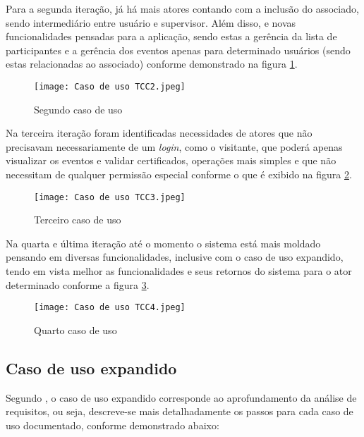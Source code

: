 Para a segunda iteração, já há mais atores contando com a inclusão do associado, sendo intermediário entre usuário e supervisor. Além disso, e novas funcionalidades pensadas para a aplicação, sendo estas a gerência da lista de participantes e a gerência dos eventos apenas para determinado usuários (sendo estas relacionadas ao associado) conforme demonstrado na figura \ref{caso_uso_2}.

\begin{figure}[H]
    \caption{\label{caso_uso_2}Segundo caso de uso}
    \vspace{5pt}
    \centering
    \texttt{[image: Caso de uso TCC2.jpeg]}
    \vspace{5pt}
\end{figure}

Na terceira iteração foram identificadas necessidades de atores que não precisavam necessariamente de um \textit{login}, como o visitante, que poderá apenas visualizar os eventos e validar certificados, operações mais simples e que não necessitam de qualquer permissão especial conforme o que é exibido na figura \ref{caso_uso_3}. 

\begin{figure}[H]
    \caption{\label{caso_uso_3}Terceiro caso de uso}
    \vspace{5pt}
    \centering
    \texttt{[image: Caso de uso TCC3.jpeg]}
    \vspace{5pt}
\end{figure}

Na quarta e última iteração até o momento o sistema está mais moldado pensando em diversas funcionalidades, inclusive com o caso de uso expandido, tendo em vista melhor as funcionalidades e seus retornos do sistema para o ator determinado conforme a figura \ref{caso_uso_4}.

\begin{figure}[H]
    \caption{\label{caso_uso_4}Quarto caso de uso}
    \vspace{5pt}
    \centering
    \texttt{[image: Caso de uso TCC4.jpeg]}
    \vspace{5pt}
\end{figure}

\subsection{Caso de uso expandido}
Segundo , o caso de uso expandido corresponde ao aprofundamento da análise de requisitos, ou seja, descreve-se mais detalhadamente os passos para cada caso de uso documentado, conforme demonstrado abaixo:

